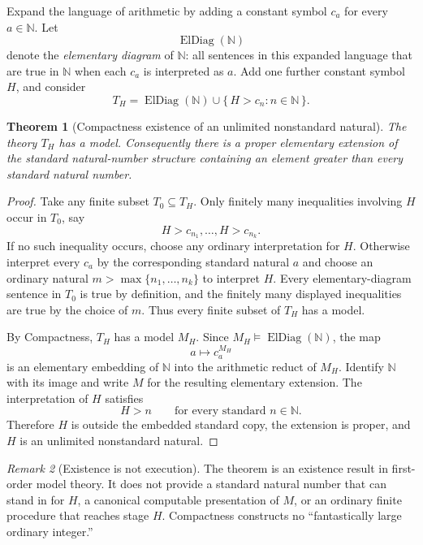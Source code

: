 \documentclass[11pt,openany]{book}
\newtheorem{theorem}{Theorem}[chapter]
\theoremstyle{definition}
\theoremstyle{remark}
\newtheorem{remark}[theorem]{Remark}
\newcommand{\N}{\mathbb{N}}
\begin{document}
Expand the language of arithmetic by adding a constant symbol \(c_a\) for every \(a\in\N\). Let
\[
\operatorname{ElDiag}(\N)
\]
denote the \emph{elementary diagram} of \(\N\): all sentences in this expanded language that are true in \(\N\) when each \(c_a\) is interpreted as \(a\). Add one further constant symbol \(H\), and consider
\[
T_H
=
\operatorname{ElDiag}(\N)
\cup
\{\,H>c_n:n\in\N\,\}.
\]

\begin{theorem}[Compactness existence of an unlimited nonstandard natural]\label{thm:compactness-unlimited}
The theory \(T_H\) has a model. Consequently there is a proper elementary extension of the standard natural-number structure containing an element greater than every standard natural number.
\end{theorem}
\begin{proof}
Take any finite subset \(T_0\subseteq T_H\). Only finitely many inequalities involving \(H\) occur in \(T_0\), say
\[
H>c_{n_1},\ldots,H>c_{n_k}.
\]
If no such inequality occurs, choose any ordinary interpretation for \(H\). Otherwise interpret every \(c_a\) by the corresponding standard natural \(a\) and choose an ordinary natural \(m>\max\{n_1,\ldots,n_k\}\) to interpret \(H\). Every elementary-diagram sentence in \(T_0\) is true by definition, and the finitely many displayed inequalities are true by the choice of \(m\). Thus every finite subset of \(T_H\) has a model.

By Compactness, \(T_H\) has a model \(M_H\). Since \(M_H\models\operatorname{ElDiag}(\N)\), the map
\[
a\longmapsto c_a^{M_H}
\]
is an elementary embedding of \(\N\) into the arithmetic reduct of \(M_H\). Identify \(\N\) with its image and write \(M\) for the resulting elementary extension. The interpretation of \(H\) satisfies
\[
H>n\qquad\text{for every standard }n\in\N.
\]
Therefore \(H\) is outside the embedded standard copy, the extension is proper, and \(H\) is an unlimited nonstandard natural.
\end{proof}

\begin{remark}[Existence is not execution]\label{rem:compactness-not-computation}
The theorem is an existence result in first-order model theory. It does not provide a standard natural number that can stand in for \(H\), a canonical computable presentation of \(M\), or an ordinary finite procedure that reaches stage \(H\). Compactness constructs no ``fantastically large ordinary integer.''
\end{remark}
\end{document}
